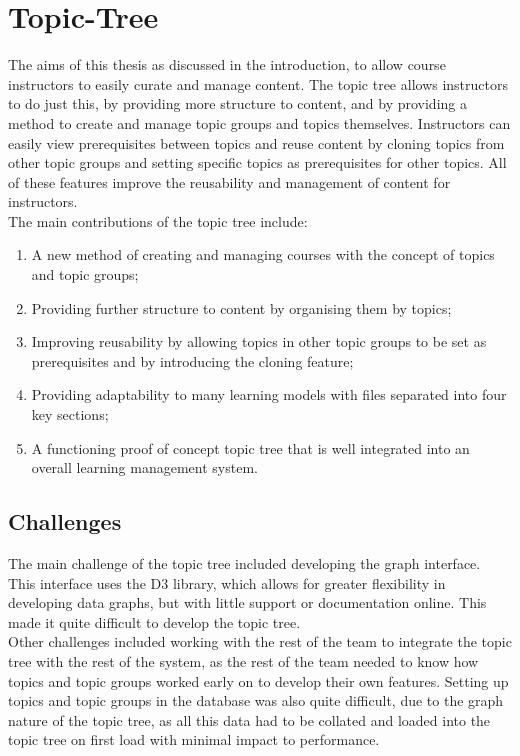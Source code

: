 \section{Topic-Tree}
The aims of this thesis as discussed in the introduction, to allow course instructors to easily curate and manage content. The topic tree allows instructors to do just this, by providing more structure to content, and by providing a method to create and manage topic groups and topics themselves. Instructors can easily view prerequisites between topics and reuse content by cloning topics from other topic groups and setting specific topics as prerequisites for other topics. All of these features improve the reusability and management of content for instructors.\\

The main contributions of the topic tree include:
\begin{enumerate}
    \item A new method of creating and managing courses with the concept of topics and topic groups;
	\item Providing further structure to content by organising them by topics;
	\item Improving reusability by allowing topics in other topic groups to be set as prerequisites and by introducing the cloning feature;
    \item Providing adaptability to many learning models with files separated into four key sections;
    \item A functioning proof of concept topic tree that is well integrated into an overall learning management system.
\end{enumerate}

\subsection{Challenges}
The main challenge of the topic tree included developing the graph interface. This interface uses the D3 library, which allows for greater flexibility in developing data graphs, but with little support or documentation online. This made it quite difficult to develop the topic tree.\\

Other challenges included working with the rest of the team to integrate the topic tree with the rest of the system, as the rest of the team needed to know how topics and topic groups worked early on to develop their own features. Setting up topics and topic groups in the database was also quite difficult, due to the graph nature of the topic tree, as all this data had to be collated and loaded into the topic tree on first load with minimal impact to performance. \\

